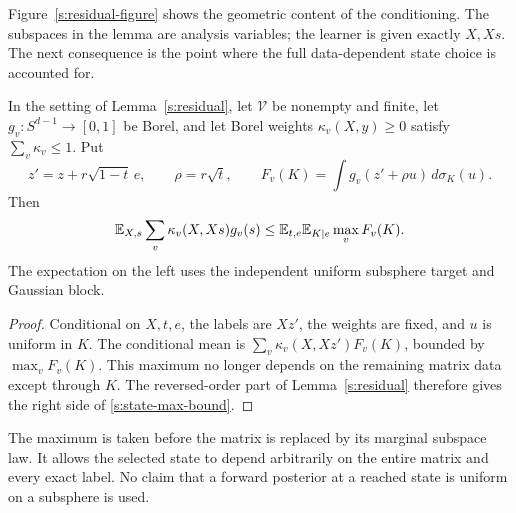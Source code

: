 Figure~\ref{s:residual-figure} shows the geometric content of the
conditioning. The subspaces in the lemma are analysis variables; the
learner is given exactly \(X,Xs\). The next consequence is the point
where the full data-dependent state choice is accounted for.

\begin{lemma}\label{s:state-maximum}
In the setting of Lemma~\ref{s:residual}, let \(\mathcal V\) be nonempty and finite,
let \(g_v:S^{d-1}\to[0,1]\) be Borel, and let Borel weights
\(\kappa_v(X,y)\ge0\) satisfy \(\sum_v\kappa_v\le1\). Put
\[
 z'=z+r\sqrt{1-t}\,e,\qquad \rho=r\sqrt t,\qquad
 F_v(K)=\int g_v(z'+\rho u)\,d\sigma_K(u).
\]
Then
\begin{equation}\label{s:state-max-bound}
 \mathbb E_{X,s}\sum_v\kappa_v(X,Xs)g_v(s)
 \le \mathbb E_{t,e}\mathbb E_{K\mid e}\max_v F_v(K).
\end{equation}
The expectation on the left uses the independent uniform subsphere
target and Gaussian block.
\end{lemma}
\begin{proof}
Conditional on \(X,t,e\), the labels are \(Xz'\), the weights are
fixed, and \(u\) is uniform in \(K\). The conditional mean is
\(\sum_v\kappa_v(X,Xz')F_v(K)\), bounded by \(\max_vF_v(K)\).
This maximum no longer depends on the remaining matrix data except
through \(K\). The reversed-order part of Lemma~\ref{s:residual}
therefore gives the right side of \eqref{s:state-max-bound}.
\end{proof}

The maximum is taken before the matrix is replaced by its marginal
subspace law. It allows the selected state to depend arbitrarily on
the entire matrix and every exact label. No claim that a forward
posterior at a reached state is uniform on a subsphere is used.
